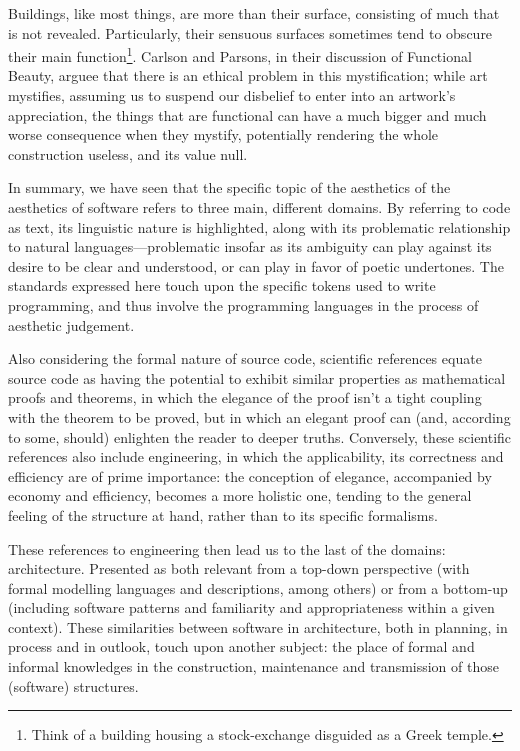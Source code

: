 Buildings, like most things, are more than their surface, consisting of much that is not revealed. Particularly, their sensuous surfaces sometimes tend to obscure their main function\footnote{Think of a building housing a stock-exchange disguided as a Greek temple.}. Carlson and Parsons, in their discussion of Functional Beauty, arguee that there is an ethical problem in this mystification; while art mystifies, assuming us to suspend our disbelief to enter into an artwork's appreciation, the things that are functional can have a much bigger and much worse consequence when they mystify, potentially rendering the whole construction useless, and its value null.

In summary, we have seen that the specific topic of the aesthetics of the aesthetics of software refers to three main, different domains. By referring to code as text, its linguistic nature is highlighted, along with its problematic relationship to natural languages—problematic insofar as its ambiguity can play against its desire to be clear and understood, or can play in favor of poetic undertones. The standards expressed here touch upon the specific tokens used to write programming, and thus involve the programming languages in the process of aesthetic judgement.

Also considering the formal nature of source code, scientific references equate source code as having the potential to exhibit similar properties as mathematical proofs and theorems, in which the elegance of the proof isn't a tight coupling with the theorem to be proved, but in which an elegant proof can (and, according to some, should) enlighten the reader to deeper truths. Conversely, these scientific references also include engineering, in which the applicability, its correctness and efficiency are of prime importance: the conception of elegance, accompanied by economy and efficiency, becomes a more holistic one, tending to the general feeling of the structure at hand, rather than to its specific formalisms.

These references to engineering then lead us to the last of the domains: architecture. Presented as both relevant from a top-down perspective (with formal modelling languages and descriptions, among others) or from a bottom-up (including software patterns and familiarity and appropriateness within a given context). These similarities between software in architecture, both in planning, in process and in outlook, touch upon another subject: the place of formal and informal knowledges in the construction, maintenance and transmission of those (software) structures.

